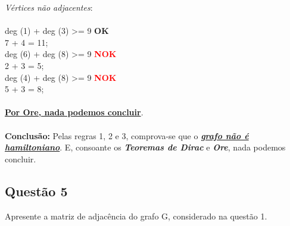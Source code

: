 \documentclass{report}
\begin{document}
\textit{Vértices não adjacentes}:\\\\
deg (1) + deg (3) >= 9 \textbf{OK} \\
7 + 4 = 11;\\
deg (6) + deg (8) >= 9 \textcolor{red}{\textbf{NOK}} \\
2 + 3 = 5;\\
deg (4) + deg (8) >= 9 \textcolor{red}{\textbf{NOK}} \\
5 + 3 = 8;\\\\
\underline{\textbf{Por Ore, nada podemos concluir}}.\\\\
\textbf{Conclusão:} Pelas regras 1, 2 e 3, comprova-se que o \underline{\textit{\textbf{grafo não é hamiltoniano}}}. E, consoante os \textit{\textbf{Teoremas de Dirac}} e \textit{\textbf{Ore}}, nada podemos concluir.


\subsection{Questão 5}
Apresente a matriz de adjacência do grafo G, considerado na questão 1.\\
\citet{quaresma_2009}
\end{document}
